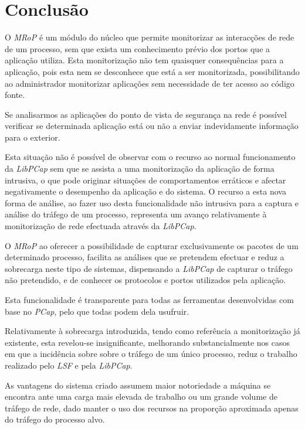 \chapter{Conclusão}
\label{cap:conclusao}

O \textit{MRoP} é um módulo do núcleo que permite monitorizar as interacções de rede de um processo, sem que exista um conhecimento prévio dos portos que a aplicação utiliza.
Esta monitorização não tem quaisquer consequências para a aplicação, pois esta nem se desconhece que está a ser monitorizada, possibilitando ao administrador monitorizar aplicações sem necessidade de ter acesso ao código fonte.

Se analisarmos as aplicações do ponto de vista de segurança na rede é possível verificar se determinada aplicação está ou não a enviar indevidamente informação para o exterior.

Esta situação não é possível de observar com o recurso ao normal funcionamento da \textit{LibPCap} sem que se assista a uma monitorização da aplicação de forma intrusiva, o que pode originar situações de comportamentos erráticos e afectar negativamente o desempenho da aplicação e do sistema.
O recurso a esta nova forma de análise, ao fazer uso desta funcionalidade não intrusiva para a captura e análise do tráfego de um processo, representa um avanço relativamente à monitorização de rede efectuada através da \textit{LibPCap}.

O \textit{MRoP} ao oferecer a possibilidade de capturar exclusivamente os pacotes de um determinado processo, facilita as análises que se pretendem efectuar e reduz a sobrecarga neste tipo de sistemas, dispensando a \textit{LibPCap} de capturar o tráfego não pretendido, e de conhecer os protocolos e portos utilizados pela aplicação.

Esta funcionalidade é transparente para todas as ferramentas desenvolvidas com base no \textit{PCap}, pelo que todas podem dela usufruir.

Relativamente à sobrecarga introduzida, tendo como referência a monitorização já existente, esta revelou-se insignificante, melhorando substancialmente nos casos em que a incidência sobre sobre o tráfego de um único processo, reduz o trabalho realizado pelo \textit{LSF} e pela \textit{LibPCap}.

As vantagens do sistema criado assumem maior notoriedade a máquina se encontra ante uma carga mais elevada de trabalho ou um grande volume de tráfego de rede, dado manter o uso dos recursos na proporção aproximada apenas do tráfego do processo alvo.


